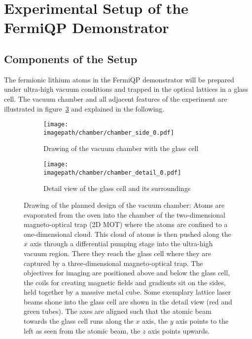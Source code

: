 \section{Experimental Setup of the FermiQP Demonstrator}

\subsection*{Components of the Setup}
The fermionic lithium atoms in the FermiQP demonstrator will be prepared under ultra-high vacuum conditions and trapped in the optical lattices in a glass cell. The vacuum chamber and all adjacent features of the experiment are illustrated in figure~\ref{fig:chamber} and explained in the following.

\begin{figure}
    \centering
    \begin{subfigure}[t]{0.64\textwidth}
        \centering
        \texttt{[image: \\imagepath/chamber/chamber\_side\_0.pdf]}
        \caption{Drawing of the vacuum chamber with the glass cell}
        \label{fig:chamber_coarse}
    \end{subfigure}
    \begin{subfigure}[t]{0.34\textwidth}
        \centering
        \texttt{[image: \\imagepath/chamber/chamber\_detail\_0.pdf]}
        \caption{Detail view of the glass cell and its surroundings}
        \label{fig:chamber_detail}
    \end{subfigure}
    \caption{Drawing of the planned design of the vacuum chamber: Atoms are evaporated from the oven into the chamber of the two-dimensional magneto-optical trap (2D MOT) where the atoms are confined to a one-dimensional cloud. This cloud of atoms is then pushed along the $x$ axis through a differential pumping stage into the ultra-high vacuum region. There they reach the glass cell where they are captured by a three-dimensional magneto-optical trap. The objectives for imaging are positioned above and below the glass cell, the coils for creating magnetic fields and gradients sit on the sides, held together by a massive metal cube. Some exemplary lattice laser beams shone into the glass cell are shown in the detail view (red and green tubes). The axes are aligned such that the atomic beam towards the glass cell runs along the $x$ axis, the $y$ axis points to the left as seen from the atomic beam, the $z$ axis points upwards.}  
    \label{fig:chamber}
\end{figure}

